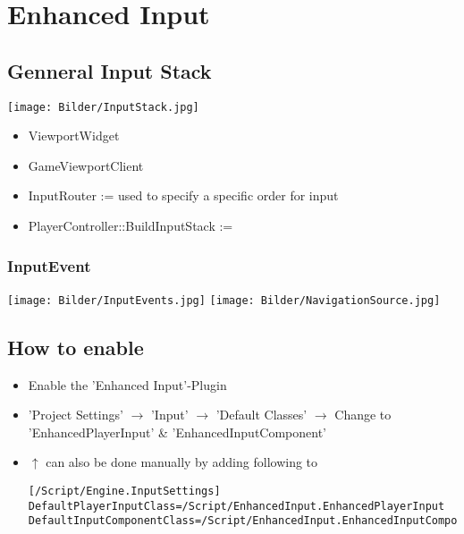 \chapter{Enhanced Input}

\section{Genneral Input Stack}
    \texttt{[image: Bilder/InputStack.jpg]}
    \begin{itemize}
        \item ViewportWidget
        \item GameViewportClient
    \end{itemize}

    \begin{itemize}
        \item InputRouter := used to specify a specific order for input
        \item PlayerController::BuildInputStack := 
    \end{itemize}

    \subsection{InputEvent}
     \texttt{[image: Bilder/InputEvents.jpg]}
      \texttt{[image: Bilder/NavigationSource.jpg]}

\section{How to enable}
    \begin{itemize}
        \item Enable the 'Enhanced Input'-Plugin
        \item 'Project Settings' $\rightarrow$ 'Input' $\rightarrow$ 'Default Classes' $\rightarrow$ Change to 'EnhancedPlayerInput' \& 'EnhancedInputComponent'
        \item $\uparrow$ can also be done manually by adding following to 
        \begin{lstlisting}
[/Script/Engine.InputSettings]
DefaultPlayerInputClass=/Script/EnhancedInput.EnhancedPlayerInput
DefaultInputComponentClass=/Script/EnhancedInput.EnhancedInputComponent                
        \end{lstlisting}
    \end{itemize}

